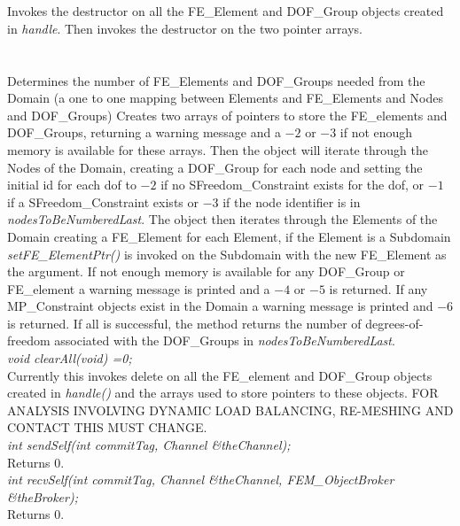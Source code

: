  \\
\\ 
Invokes the destructor on all the FE\_Element and DOF\_Group objects
created in {\em handle}. Then invokes the destructor on the two
pointer arrays. \\

\\
 \\
Determines the number of FE\_Elements and DOF\_Groups needed from the
Domain (a one to one mapping between Elements and FE\_Elements and
Nodes and DOF\_Groups) Creates two arrays of pointers to store the
FE\_elements and DOF\_Groups, returning a warning message and a $-2$
or $-3$ if not enough memory is available for these arrays. Then the
object will iterate through the Nodes of the Domain, creating a
DOF\_Group for each node and setting the initial id for each dof to
$-2$ if no SFreedom\_Constraint exists for the dof, or $-1$ if a
SFreedom\_Constraint exists or $-3$ if the node identifier is in {\em
nodesToBeNumberedLast}. The object then iterates through the Elements
of the Domain creating a FE\_Element for each Element, if the Element
is a Subdomain {\em setFE\_ElementPtr()} is invoked on the Subdomain
with the new FE\_Element as the argument. If not enough memory is
available for any DOF\_Group or FE\_element a warning message is
printed and a $-4$ or $-5$ is returned. If any MP\_Constraint objects
exist in the Domain a warning message is printed and $-6$ is
returned. If all is successful, the method returns the number of
degrees-of-freedom associated with the DOF\_Groups in {\em
nodesToBeNumberedLast}. \\ 

{\em void clearAll(void) =0;} \\
Currently this invokes delete on all the FE\_element and DOF\_Group
objects created in {\em handle()} and the arrays used to store
pointers to these objects. FOR ANALYSIS INVOLVING DYNAMIC LOAD
BALANCING, RE-MESHING AND CONTACT THIS MUST CHANGE. \\

{\em int sendSelf(int commitTag, Channel \&theChannel); } \\
Returns $0$. \\

{\em int recvSelf(int commitTag, Channel \&theChannel, FEM\_ObjectBroker
\&theBroker); } \\
Returns $0$. 
